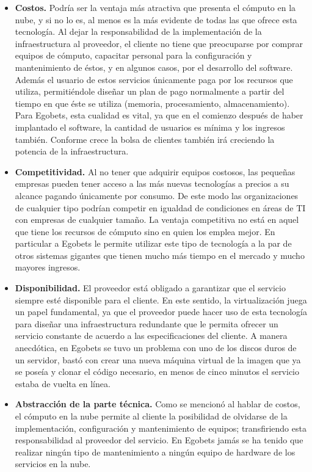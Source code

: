 \begin{itemize}
	\item \textbf{Costos.} Podría ser la ventaja más atractiva que presenta el cómputo en la nube, y si no lo es, al menos es la más evidente de todas las que ofrece esta tecnología. Al dejar la responsabilidad de la implementación de la infraestructura al proveedor, el cliente no tiene que preocuparse por comprar equipos de cómputo, capacitar personal para la configuración y mantenimiento de éstos, y en algunos casos, por el desarrollo del software. Además el usuario de estos servicios únicamente paga por los recursos que utiliza, permitiéndole diseñar un plan de pago normalmente a partir del tiempo en que éste se utiliza (memoria, procesamiento, almacenamiento). Para Egobets, esta cualidad es vital, ya que en el comienzo después de haber implantado el software, la cantidad de usuarios es mínima y los ingresos también. Conforme crece la bolsa de clientes también irá creciendo la potencia de la infraestructura.

	\item \textbf{Competitividad.} Al no tener que adquirir equipos costosos, las pequeñas empresas pueden tener acceso a las más nuevas tecnologías a precios a su alcance pagando únicamente por consumo. De este modo las organizaciones de cualquier tipo podrían competir en igualdad de condiciones en áreas de TI con empresas de cualquier tamaño. La ventaja competitiva no está en aquel que tiene los recursos de cómputo sino en quien los emplea mejor. En particular a Egobets le permite utilizar este tipo de tecnología a la par de otros sistemas gigantes que tienen mucho más tiempo en el mercado y mucho mayores ingresos.

	\item \textbf{Disponibilidad.} El proveedor está obligado a garantizar que el servicio siempre esté disponible para el cliente. En este sentido, la virtualización juega un papel fundamental, ya que el proveedor puede hacer uso de esta tecnología para diseñar una infraestructura redundante que le permita ofrecer un servicio constante de acuerdo a las especificaciones del cliente. A manera anecdótica, en Egobets se tuvo un problema con uno de los discos duros de un servidor, bastó con crear una nueva máquina virtual de la imagen que ya se poseía y clonar el código necesario, en menos de cinco minutos el servicio estaba de vuelta en línea.

	\item \textbf{Abstracción de la parte técnica.} Como se mencionó al hablar de costos, el cómputo en la nube permite al cliente la posibilidad de olvidarse de la implementación, configuración y mantenimiento de equipos; transfiriendo esta responsabilidad al proveedor del servicio. En Egobets jamás se ha tenido que realizar ningún tipo de mantenimiento a ningún equipo de hardware de los servicios en la nube.


\end{itemize}
